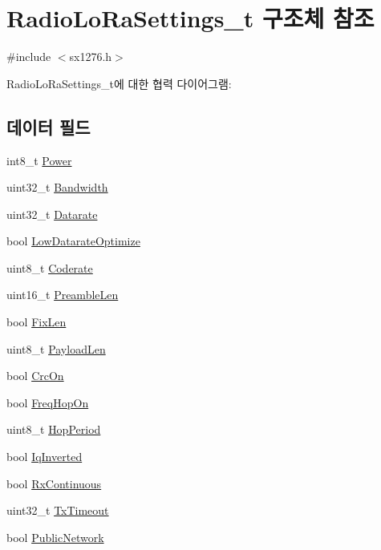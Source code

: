 \hypertarget{struct_radio_lo_ra_settings__t}{}\section{Radio\+Lo\+Ra\+Settings\+\_\+t 구조체 참조}
\label{struct_radio_lo_ra_settings__t}


{\ttfamily \#include $<$sx1276.\+h$>$}



Radio\+Lo\+Ra\+Settings\+\_\+t에 대한 협력 다이어그램\+:
\subsection*{데이터 필드}
\begin{DoxyCompactItemize}
\item 
int8\+\_\+t \mbox{\hyperlink{struct_radio_lo_ra_settings__t_a6ebc6ad47329ddd2d5e0d30ae0310a1e}{Power}}
\item 
uint32\+\_\+t \mbox{\hyperlink{struct_radio_lo_ra_settings__t_a318fb6591ed9e732fef8c459c246e8cb}{Bandwidth}}
\item 
uint32\+\_\+t \mbox{\hyperlink{struct_radio_lo_ra_settings__t_a4bac4b1fd8c58112bafb1514fc95ad46}{Datarate}}
\item 
bool \mbox{\hyperlink{struct_radio_lo_ra_settings__t_aa31ed68ea167b5abf2f3e3aba9f23b86}{Low\+Datarate\+Optimize}}
\item 
uint8\+\_\+t \mbox{\hyperlink{struct_radio_lo_ra_settings__t_abb9fc996b28014f5d9b5d68ec359dc58}{Coderate}}
\item 
uint16\+\_\+t \mbox{\hyperlink{struct_radio_lo_ra_settings__t_aba9cfa7d2470ee0e474fa6442d68f994}{Preamble\+Len}}
\item 
bool \mbox{\hyperlink{struct_radio_lo_ra_settings__t_a5595c2171f2df06f2dc36c58902eb890}{Fix\+Len}}
\item 
uint8\+\_\+t \mbox{\hyperlink{struct_radio_lo_ra_settings__t_aaa50a56616dec6cdf36915d97722c413}{Payload\+Len}}
\item 
bool \mbox{\hyperlink{struct_radio_lo_ra_settings__t_a97bd90b59a970e4bb2195cf648a380d3}{Crc\+On}}
\item 
bool \mbox{\hyperlink{struct_radio_lo_ra_settings__t_a84cd8f4535bc2447be083a8e1dc3b1e7}{Freq\+Hop\+On}}
\item 
uint8\+\_\+t \mbox{\hyperlink{struct_radio_lo_ra_settings__t_a9d16142b366001eb65bfd9afdc04361d}{Hop\+Period}}
\item 
bool \mbox{\hyperlink{struct_radio_lo_ra_settings__t_ae72a925b57b29eb0c1fcd0334a972c0a}{Iq\+Inverted}}
\item 
bool \mbox{\hyperlink{struct_radio_lo_ra_settings__t_ad155d9bae95f09d927ca588dc4f4734a}{Rx\+Continuous}}
\item 
uint32\+\_\+t \mbox{\hyperlink{struct_radio_lo_ra_settings__t_a51e578bc6e36b50abdbf3c91be46bc5b}{Tx\+Timeout}}
\item 
bool \mbox{\hyperlink{struct_radio_lo_ra_settings__t_ad5c7c76904042bd86508425be3b91a05}{Public\+Network}}
\end{DoxyCompactItemize}


